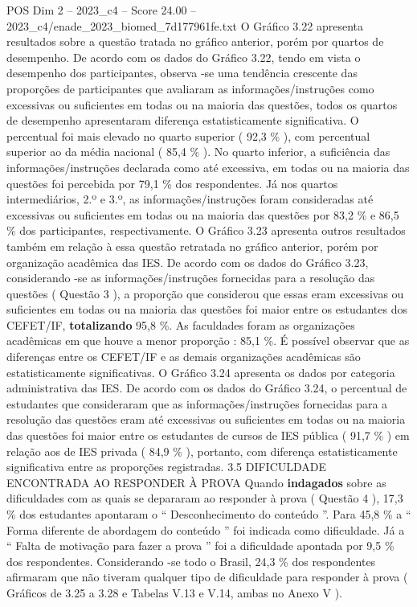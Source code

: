 \begin{textsample}{POS Dim 2 – 2023\_c4 – Score 24.00 – 2023\_c4/enade\_2023\_biomed\_7d177961fe.txt}
O Gráfico 3.22 apresenta resultados sobre a questão tratada no gráfico anterior, porém por quartos de desempenho.
De acordo com os dados do Gráfico 3.22, tendo em vista o desempenho dos participantes, observa -se uma tendência crescente das proporções de participantes que avaliaram as informações/instruções como excessivas ou suficientes em todas ou na maioria das questões, todos os quartos de desempenho apresentaram diferença estatisticamente significativa.
O percentual foi mais elevado no quarto superior ( 92,3 \% ), com percentual superior ao da média nacional ( 85,4 \% ).
No quarto inferior, a suficiência das informações/instruções declarada como até excessiva, em todas ou na maioria das questões foi percebida por 79,1 \% dos respondentes.
Já nos quartos intermediários, 2.º e 3.º, as informações/instruções foram consideradas até excessivas ou suficientes em todas ou na maioria das questões por 83,2 \% e 86,5 \% dos participantes, respectivamente.
O Gráfico 3.23 apresenta outros resultados também em relação à essa questão retratada no gráfico anterior, porém por organização acadêmica das IES.
De acordo com os dados do Gráfico 3.23, considerando -se as informações/instruções fornecidas para a resolução das questões ( Questão 3 ), a proporção que considerou que essas eram excessivas ou suficientes em todas ou na maioria das questões foi maior entre os estudantes dos CEFET/IF, \textbf{totalizando} 95,8 \%.
As faculdades foram as organizações acadêmicas em que houve a menor proporção : 85,1 \%.
É possível observar que as diferenças entre os CEFET/IF e as demais organizações acadêmicas são estatisticamente significativas.
O Gráfico 3.24 apresenta os dados por categoria administrativa das IES.
De acordo com os dados do Gráfico 3.24, o percentual de estudantes que consideraram que as informações/instruções fornecidas para a resolução das questões eram até excessivas ou suficientes em todas ou na maioria das questões foi maior entre os estudantes de cursos de IES pública ( 91,7 \% ) em relação aos de IES privada ( 84,9 \% ), portanto, com diferença estatisticamente significativa entre as proporções registradas. 3.5 DIFICULDADE ENCONTRADA AO RESPONDER À PROVA Quando \textbf{indagados} sobre as dificuldades com as quais se depararam ao responder à prova ( Questão 4 ), 17,3 \% dos estudantes apontaram o “ Desconhecimento do conteúdo ”.
Para 45,8 \% a “ Forma diferente de abordagem do conteúdo ” foi indicada como dificuldade.
Já a “ Falta de motivação para fazer a prova ” foi a dificuldade apontada por 9,5 \% dos respondentes.
Considerando -se todo o Brasil, 24,3 \% dos respondentes afirmaram que não tiveram qualquer tipo de dificuldade para responder à prova ( Gráficos de 3.25 a 3.28 e Tabelas V.13 e V.14, ambas no Anexo V ).

\end{textsample}
